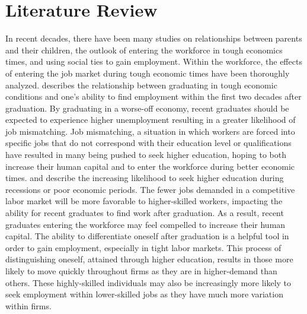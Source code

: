 \documentclass[12pt]{article}
\begin{document}
\section{Literature Review} \label{sec:literature}
In recent decades, there have been many studies on relationships between parents and their children, the outlook of entering the workforce in tough economics times, and using social ties to gain employment. Within the workforce, the effects of entering the job market during tough economic times have been thoroughly analyzed. \cite{kahn_long-term_2010} describes the relationship between graduating in tough economic conditions and one's ability to find employment within the first two decades after graduation. By graduating in a worse-off economy, recent graduates should be expected to experience higher unemployment resulting in a greater likelihood of job mismatching. Job mismatching, a situation in which workers are forced into specific jobs that do not correspond with their education level or qualifications have resulted in many being pushed to seek higher education, hoping to both increase their human capital and to enter the workforce during better economic times. \cite{schwandt_unlucky_2019} and \cite{oreopoulos_short-_2012} describe the increasing likelihood to seek higher education during recessions or poor economic periods. The fewer jobs demanded in a competitive labor market will be more favorable to higher-skilled workers, impacting the ability for recent graduates to find work after graduation. As a result, recent graduates entering the workforce may feel compelled to increase their human capital. The ability to differentiate oneself after graduation is a helpful tool in order to gain employment, especially in tight labor markets. This process of distinguishing oneself, attained through higher education, results in those more likely to move quickly throughout firms as they are in higher-demand than others. These highly-skilled individuals  may also be increasingly more likely to seek employment within lower-skilled jobs as they have much more variation within firms. 
\end{document}

